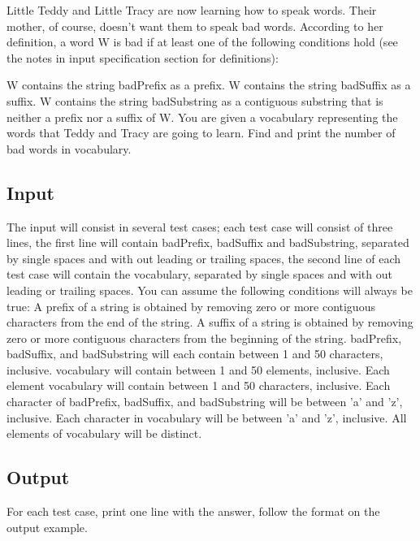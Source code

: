 Little Teddy and Little Tracy are now learning how to speak words. Their mother, of course, doesn't want them to speak bad words. According to her definition, a word W is bad if at least one of the following conditions hold (see the notes in input specification section for definitions):

W contains the string badPrefix as a prefix.
W contains the string badSuffix as a suffix.
W contains the string badSubstring as a contiguous substring that is neither a prefix nor a suffix of W.
You are given a vocabulary representing the words that Teddy and Tracy are going to learn. Find and print the number of bad words in vocabulary.

\subsection* {Input}

The input will consist in several test cases; each test case will consist of three lines, the first line will contain badPrefix, badSuffix and badSubstring, separated by single spaces and with out leading or trailing spaces, the second line of each test case will contain the vocabulary, separated by single spaces and with out leading or trailing spaces. You can assume the following conditions will always be true:
A prefix of a string is obtained by removing zero or more contiguous characters from the end of the string.
A suffix of a string is obtained by removing zero or more contiguous characters from the beginning of the string.
badPrefix, badSuffix, and badSubstring will each contain between 1 and 50 characters, inclusive.
vocabulary will contain between 1 and 50 elements, inclusive.
Each element vocabulary will contain between 1 and 50 characters, inclusive.
Each character of badPrefix, badSuffix, and badSubstring will be between 'a' and 'z', inclusive.
Each character in vocabulary will be between 'a' and 'z', inclusive.
All elements of vocabulary will be distinct.

\subsection* {Output}

For each test case, print one line with the answer, follow the format on the output example.

\outputnotice

